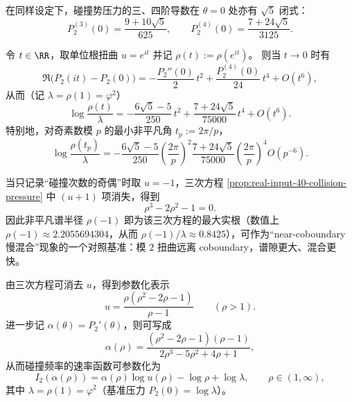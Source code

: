 \begin{corollary}[三、四阶累积量闭式]\label{cor:real-input-40-collision-cumulants-higher}
在同样设定下，碰撞势压力的三、四阶导数在 $\theta=0$ 处亦有 $\sqrt5$ 闭式：
\[
\boxed{\;
P_2^{(3)}(0)=\frac{9+10\sqrt5}{625},
\qquad
P_2^{(4)}(0)=\frac{7+24\sqrt5}{3125}.
\;}
\]
\end{corollary}

\begin{corollary}[单位根扭曲下的四阶谱隙渐近]\label{cor:real-input-40-collision-twist-fourth}
令 $t\in\RR$，取单位根扭曲 $u=e^{it}$ 并记
\(
\rho(t):=\rho(e^{it})
\)。
则当 $t\to 0$ 时有
\[
\Re\bigl(P_2(it)-P_2(0)\bigr)
=-\frac{P_2''(0)}{2}\,t^2+\frac{P_2^{(4)}(0)}{24}\,t^4+O(t^6),
\]
从而（记 $\lambda=\rho(1)=\varphi^2$）
\[
\boxed{\
\log\frac{\rho(t)}{\lambda}
=-\frac{6\sqrt5-5}{250}\,t^2+\frac{7+24\sqrt5}{75000}\,t^4+O(t^6).
\ }
\]
特别地，对奇素数模 $p$ 的最小非平凡角 $t_p:=2\pi/p$，
\[
\log\frac{\rho(t_p)}{\lambda}
=-\frac{6\sqrt5-5}{250}\left(\frac{2\pi}{p}\right)^2
\frac{7+24\sqrt5}{75000}\left(\frac{2\pi}{p}\right)^4
O\!\left(p^{-6}\right).
\]
\end{corollary}

\begin{remark}\label{rem:real-input-40-collision-parity}
当只记录“碰撞次数的奇偶”时取 $u=-1$，三次方程 \eqref{prop:real-input-40-collision-pressure} 中 $(u+1)$ 项消失，得到
\[
\rho^3-2\rho^2-1=0.
\]
因此非平凡谱半径 $\rho(-1)$ 即为该三次方程的最大实根（数值上 $\rho(-1)\approx 2.2055694304$，从而 $\rho(-1)/\lambda\approx 0.8425$），可作为“near-coboundary 慢混合”现象的一个对照基准：模 $2$ 扭曲远离 coboundary，谱隙更大、混合更快。
\end{remark}

\begin{remark}[碰撞频率的大偏差参数化]\label{rem:real-input-40-collision-ldp-param}
由三次方程可消去 $u$，得到参数化表示
\[
u=\frac{\rho(\rho^2-2\rho-1)}{\rho-1}\qquad(\rho>1).
\]
进一步记 $\alpha(\theta)=P_2'(\theta)$，则可写成
\[
\alpha(\rho)=\frac{(\rho^2-2\rho-1)(\rho-1)}{2\rho^3-5\rho^2+4\rho+1},
\]
从而碰撞频率的速率函数可参数化为
\[
I_2(\alpha(\rho))=\alpha(\rho)\log u(\rho)-\log\rho+\log\lambda,\qquad \rho\in(1,\infty),
\]
其中 \(\lambda=\rho(1)=\varphi^2\)（基准压力 \(P_2(0)=\log\lambda\)）。
\end{remark}

